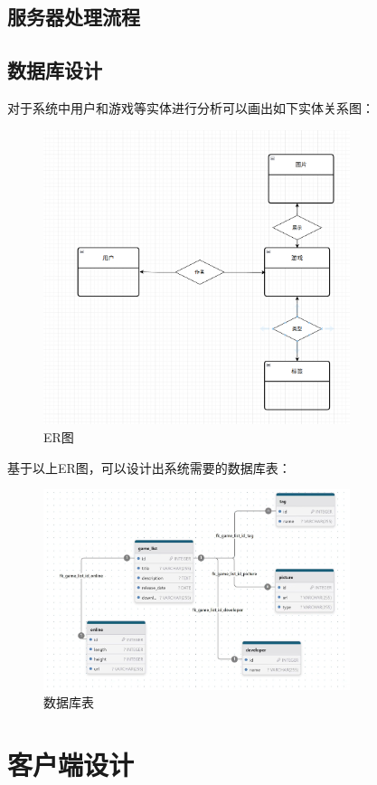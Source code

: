 \documentclass[12pt]{ctexart} %
\begin{document}
\subsection{服务器处理流程}
\subsection{数据库设计}
对于系统中用户和游戏等实体进行分析可以画出如下实体关系图：
\begin{figure}[H]
  \centering
  \includegraphics[width=0.8\textwidth]{dataset_ER.png}
  \caption{ER图}
\end{figure}
基于以上ER图，可以设计出系统需要的数据库表：
\begin{figure}[H]
  \centering
  \includegraphics[width=0.8\textwidth]{dataset_metadata.jpg}
  \caption{数据库表}
\end{figure}

\section{客户端设计}
\end{document}
